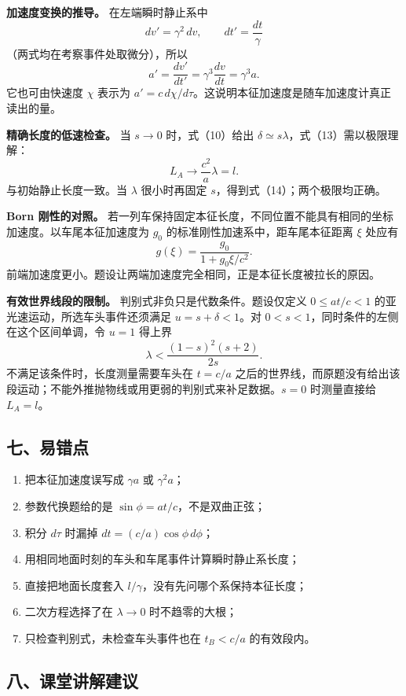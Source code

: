 \documentclass[12pt,a4paper,UTF8]{ctexart}
\newcommand{\tightlist}{\setlength{\itemsep}{0pt}\setlength{\parskip}{0pt}}
\begin{document}
\textbf{加速度变换的推导。} 在左端瞬时静止系中 \[
dv'=\gamma^2\,dv,\qquad dt'=\frac{dt}{\gamma}
\] （两式均在考察事件处取微分），所以 \[
a'=\frac{dv'}{dt'}=\gamma^3\frac{dv}{dt}
=\gamma^3a.
\] 它也可由快速度 \(\chi\) 表示为
\(a'=c\,d\chi/d\tau\)。这说明本征加速度是随车加速度计真正读出的量。

\textbf{精确长度的低速检查。} 当 \(s\to0\) 时，式（10）给出
\(\delta\simeq s\lambda\)，式（13）需以极限理解： \[
L_A\to\frac{c^2}{a}\lambda=l.
\] 与初始静止长度一致。当 \(\lambda\) 很小时再固定
\(s\)，得到式（14）；两个极限均正确。

\textbf{Born 刚性的对照。}
若一列车保持固定本征长度，不同位置不能具有相同的坐标加速度。以车尾本征加速度为
\(g_0\) 的标准刚性加速系中，距车尾本征距离 \(\xi\) 处应有 \[
g(\xi)=\frac{g_0}{1+g_0\xi/c^2}.
\] 前端加速度更小。题设让两端加速度完全相同，正是本征长度被拉长的原因。

\textbf{有效世界线段的限制。} 判别式非负只是代数条件。题设仅定义
\(0\le at/c<1\) 的亚光速运动，所选车头事件还须满足 \(u=s+\delta<1\)。对
\(0<s<1\)，同时条件的左侧在这个区间单调，令 \(u=1\) 得上界 \[
\boxed{\lambda<\frac{(1-s)^2(s+2)}{2s}}.
\] 不满足该条件时，长度测量需要车头在 \(t=c/a\)
之后的世界线，而原题没有给出该段运动；不能外推抛物线或用更弱的判别式来补足数据。\(s=0\)
时测量直接给 \(L_A=l\)。

\subsection{七、易错点}\label{ux4e03ux6613ux9519ux70b9-7}

\begin{enumerate}
\def\labelenumi{\arabic{enumi}.}
\tightlist
\item
  把本征加速度误写成 \(\gamma a\) 或 \(\gamma^2a\)；
\item
  参数代换题给的是 \(\sin\phi=at/c\)，不是双曲正弦；
\item
  积分 \(d\tau\) 时漏掉 \(dt=(c/a)\cos\phi\,d\phi\)；
\item
  用相同地面时刻的车头和车尾事件计算瞬时静止系长度；
\item
  直接把地面长度套入 \(l/\gamma\)，没有先问哪个系保持本征长度；
\item
  二次方程选择了在 \(\lambda\to0\) 时不趋零的大根；
\item
  只检查判别式，未检查车头事件也在 \(t_B<c/a\) 的有效段内。
\end{enumerate}

\subsection{八、课堂讲解建议}\label{ux516bux8bfeux5802ux8bb2ux89e3ux5efaux8bae-7}
\end{document}
